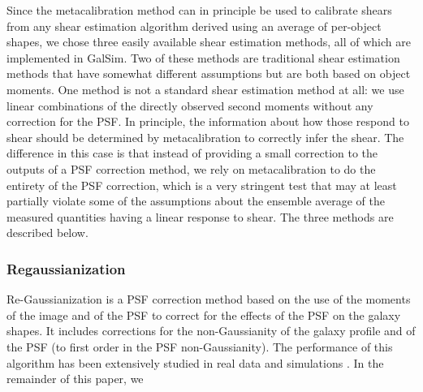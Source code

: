 \documentclass[iop]{emulateapj}
\begin{document}
Since the metacalibration method can in principle be used to calibrate
shears from any shear estimation algorithm derived using an average of per-object shapes, we chose three easily
available shear estimation methods, all of which are implemented in
GalSim.  Two of these methods are traditional shear estimation
methods that have somewhat different assumptions but are both based on
object moments.  One method is not a standard shear estimation method
at all: we use linear combinations of the directly observed second
moments without any correction for the PSF.  In principle, the
information about how those respond to shear should be determined by
metacalibration to correctly infer the shear.  The difference in this
case is that instead of providing a small correction to the outputs of
a PSF correction method, we rely on metacalibration to do the entirety
of the PSF correction, which is a very stringent test that may at least 
partially violate some of the assumptions about the ensemble average of the measured quantities having a linear
response to shear.  The three methods are described below.

\subsubsection{Regaussianization}

Re-Gaussianization \citep{2003MNRAS.343..459H} is a PSF correction
method based on the use of the moments of the image and of the PSF to
correct for the effects of the PSF on the galaxy shapes. It includes
corrections for the non-Gaussianity of the galaxy profile
\citep{2002AJ....123..583B,2003MNRAS.343..459H} and of the PSF (to
first order in the PSF non-Gaussianity). The performance of this
algorithm has been extensively studied in real data and simulations
\citep[e.g.,][]{2005MNRAS.361.1287M,2012MNRAS.420.1518M,2013MNRAS.432.1544M,2015MNRAS.450.2963M}. In
the remainder of this paper, we 
\end{document}
